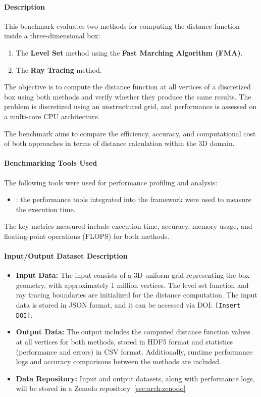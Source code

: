 \paragraph{Description}
This benchmark evaluates two methods for computing the distance function inside a three-dimensional box:
\begin{enumerate}
    \item The \textbf{Level Set} method using the \textbf{Fast Marching Algorithm (FMA)}.
    \item The \textbf{Ray Tracing} method.
\end{enumerate}
The objective is to compute the distance function at all vertices of a discretized box using both methods and verify whether they produce the same results.
The problem is discretized using an unstructured grid, and performance is assessed on a multi-core CPU architecture.

The benchmark aims to compare the efficiency, accuracy, and computational cost of both approaches in terms of distance calculation within the 3D domain.

\paragraph{Benchmarking Tools Used}
The following tools were used for performance profiling and analysis:
\begin{itemize}
\item \textbf{\Feelpp}: the performance tools integrated into the \Feelpp framework were used to measure the execution time.
\end{itemize}

The key metrics measured include execution time, accuracy, memory usage, and floating-point operations (FLOPS) for both methods.

\paragraph{Input/Output Dataset Description}
\begin{itemize}
    \item \textbf{Input Data:} The input consists of a 3D uniform grid representing the box geometry, with approximately 1 million vertices. The level set function and ray tracing boundaries are initialized for the distance computation. The input data is stored in JSON format, and it can be accessed via DOI: \texttt{[Insert DOI]}.

    \item \textbf{Output Data:} The output includes the computed distance function values at all vertices for both methods, stored in HDF5 format and statistics (performance and errors) in CSV format. Additionally, runtime performance logs and accuracy comparisons between the methods are included.

    \item \textbf{Data Repository:} Input and output datasets, along with performance logs, will be stored in a Zenodo repository~\cref{sec:arch:zenodo}
\end{itemize}

